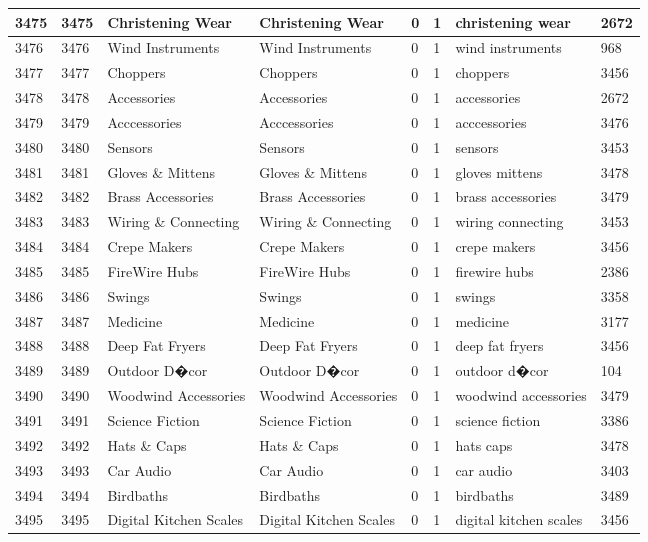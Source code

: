 \begin{longtable}{|l|l|l|l|l|l|l|l|}
3475 & 3475 & Christening Wear & Christening Wear & 0 & 1 & christening wear & 2672 \\ \hline 
3476 & 3476 & Wind Instruments & Wind Instruments & 0 & 1 & wind instruments & 968 \\ \hline 
3477 & 3477 & Choppers & Choppers & 0 & 1 & choppers & 3456 \\ \hline 
3478 & 3478 & Accessories & Accessories & 0 & 1 & accessories & 2672 \\ \hline 
3479 & 3479 & Acccessories & Acccessories & 0 & 1 & acccessories & 3476 \\ \hline 
3480 & 3480 & Sensors & Sensors & 0 & 1 & sensors & 3453 \\ \hline 
3481 & 3481 & Gloves \& Mittens & Gloves \& Mittens & 0 & 1 & gloves mittens & 3478 \\ \hline 
3482 & 3482 & Brass Accessories & Brass Accessories & 0 & 1 & brass accessories & 3479 \\ \hline 
3483 & 3483 & Wiring \& Connecting & Wiring \& Connecting & 0 & 1 & wiring connecting & 3453 \\ \hline 
3484 & 3484 & Crepe Makers & Crepe Makers & 0 & 1 & crepe makers & 3456 \\ \hline 
3485 & 3485 & FireWire Hubs & FireWire Hubs & 0 & 1 & firewire hubs & 2386 \\ \hline 
3486 & 3486 & Swings & Swings & 0 & 1 & swings & 3358 \\ \hline 
3487 & 3487 & Medicine & Medicine & 0 & 1 & medicine & 3177 \\ \hline 
3488 & 3488 & Deep Fat Fryers & Deep Fat Fryers & 0 & 1 & deep fat fryers & 3456 \\ \hline 
3489 & 3489 & Outdoor D�cor & Outdoor D�cor & 0 & 1 & outdoor d�cor & 104 \\ \hline 
3490 & 3490 & Woodwind Accessories & Woodwind Accessories & 0 & 1 & woodwind accessories & 3479 \\ \hline 
3491 & 3491 & Science Fiction & Science Fiction & 0 & 1 & science fiction & 3386 \\ \hline 
3492 & 3492 & Hats \& Caps & Hats \& Caps & 0 & 1 & hats caps & 3478 \\ \hline 
3493 & 3493 & Car Audio & Car Audio & 0 & 1 & car audio & 3403 \\ \hline 
3494 & 3494 & Birdbaths & Birdbaths & 0 & 1 & birdbaths & 3489 \\ \hline 
3495 & 3495 & Digital Kitchen Scales & Digital Kitchen Scales & 0 & 1 & digital kitchen scales & 3456 \\ \hline 

\end{longtable}
